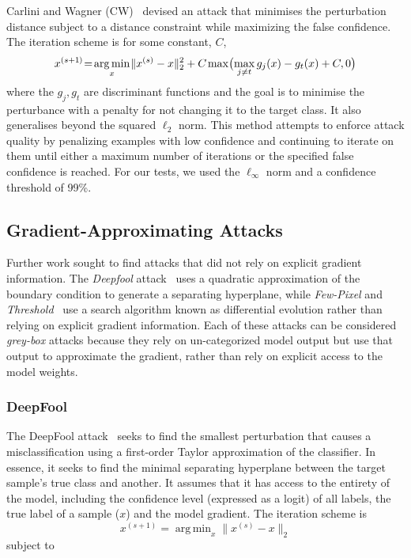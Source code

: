 \documentclass[journal]{IEEEtran}
\DeclareMathOperator*{\argmin}{arg\,min}
\begin{document}
Carlini and Wagner (CW)~\cite{carlini_towards_2017} devised an attack that minimises the perturbation distance subject to a distance constraint while maximizing the false confidence.
The iteration scheme is for some constant, $C$,
$$
    x^{(s+1\hspace{-0.025em})}\hspace{-0.2em}=\hspace{-0.15em}\argmin_x \hspace{-0.1em} \|x^{(s)} - x\|_2^2 + C \hspace{-0.05em} \max\hspace{-0.15em}\big(\hspace{-0.15em}\max_{j\neq t} g_j(x) - g_t(x) + C, 0\big)
$$
where the $g_j, g_t$ are discriminant functions and the goal is to minimise the perturbance with a penalty for not changing it to the target class.
It also generalises beyond the squared $\ell_2$ norm.
This method attempts to enforce attack quality by penalizing examples with low confidence and continuing to iterate on them until either a maximum number of iterations or the specified false confidence is reached.
For our tests, we used the $\ell_{\infty}$ norm and a confidence threshold of 99\%.

\subsection{Gradient-Approximating Attacks}

Further work sought to find attacks that did not rely on explicit gradient information.
The \textit{Deepfool} attack~\cite{deepfool} uses a quadratic approximation of the boundary condition to generate a separating hyperplane, while \textit{Few-Pixel} and \textit{Threshold}~\cite{pixelattack} use a search algorithm known as differential evolution rather than relying on explicit gradient information.
Each of these attacks can be considered \textit{grey-box} attacks because they rely on un-categorized model output but use that output to approximate the gradient, rather than rely on explicit access to the model weights.



\subsubsection{DeepFool}

The DeepFool attack~\cite{deepfool} seeks to find the smallest perturbation that causes a misclassification using a first-order Taylor approximation of the classifier.
In essence, it seeks to find the minimal separating hyperplane between the target sample's true class and another.
It assumes that it has access to the entirety of the model, including the confidence level (expressed as a logit) of all labels, the true label of a sample ($x$) and the model gradient.
The iteration scheme is
$$
    x^{(s+1)} = \argmin_x \|x^{(s)} - x\|_2
$$
subject to
\end{document}
